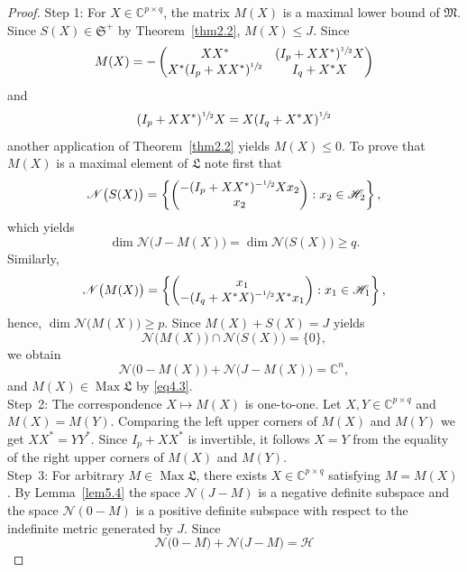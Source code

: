 \documentclass[12pt, a4paper, reqno, twoside]{amsart}
\numberwithin{equation}{section}
\DeclareMathOperator{\Max}{Max}
\newcommand{\frakS}{\mathfrak S}
\newcommand{\frakL}{\mathfrak L}
\newcommand{\frakM}{\mathfrak M}
\theoremstyle{definition}
\theoremstyle{remark}
\theoremstyle{mystyle}
\begin{document}
\begin{proof}
Step 1: For $X\in\mathbb C^{p\times q}$, the matrix $M(X)$ is a
maximal lower bound of $\frakM$. Since $S(X)\in\frakS^{+}$ by
Theorem~\ref{thm2.2}, $M(X)\leq J$. Since
\[
M(X)=
- \begin{pmatrix}
  XX^{\ast} & (I_{p}+XX^{\ast})^{\sfrac{1}{2}}X \\
  X^{\ast}(I_{p}+XX^{\ast})^{\sfrac{1}{2}} & I_{q}+X^{\ast}X
  \end{pmatrix}
\]
and
\[
(I_{p}+XX^{\ast})^{\sfrac{1}{2}}X = X(I_{q}+X^{\ast}X)^{\sfrac{1}{2}}
\]
another application of Theorem~\ref{thm2.2} yields $M(X)\leq0$. To
prove that $M(X)$ is a maximal element of $\frakL$ note first that
\[
  \mathscr N\bigl(S(X)\bigr)=\left\{
    \begin{pmatrix}
    -(I_{p}+XX^{\ast})^{-\sfrac{1}{2}} X x_{2} \\ x_{2}
    \end{pmatrix}
    : x_{2} \in\mathscr H_{2}\right\},
\]  
which yields
\[
\dim\mathscr N\bigl(J-M(X)\bigr) = \dim\mathscr N\bigl(S(X)\bigr)\geq q.
\]
Similarly,
\[
  \mathscr N\bigl(M(X)\bigr)=\left\{
    \begin{pmatrix}
    x_{1} \\
    -(I_{q}+X^{\ast}X)^{-\sfrac{1}{2}} X^{\ast}x_{1} 
    \end{pmatrix}
    : x_{1} \in\mathscr H_{1}\right\},
\]
hence, $\dim\mathscr N\bigl(M(X)\bigr)\geq p$.
Since $M(X)+S(X)=J$ yields
\[
\mathscr N\bigl(M(X)\bigr) \cap \mathscr N\bigl(S(X)\bigr) = \{0\},
\]
we obtain 
\[
\mathscr N\bigl(0-M(X)\bigr) + \mathscr N\bigl(J-M(X)\bigr) = \mathbb C^{n},
\]
and $M(X)\in\Max\frakL$ by \eqref{eq4.3}. \\
Step~2: The correspondence $X\mapsto M(X)$ is one-to-one. Let
$X,Y\in\mathbb C^{p\times q}$ and $M(X)=M(Y)$. Comparing the left
upper  corners of $M(X)$ and $M(Y)$ we get
$XX^{\ast}=YY^{\ast}$. Since $I_{p}+XX^{\ast}$ is invertible, it
follows $X=Y$ from the equality of the right upper corners of $M(X)$
and $M(Y)$. \\
Step~3: For arbitrary $M\in\Max\frakL$, there exists $X\in\mathbb
C^{p\times q}$ satisfying $M=M(X)$. By Lemma~\ref{lem5.4} the space
$\mathscr N(J-M)$ is a negative definite subspace and the space
$\mathscr N(0-M)$ is a positive definite subspace with respect to the
indefinite metric generated by $J$. Since 
\begin{equation}
\label{eq5.4}  
\mathscr N\bigl(0-M\bigr) + \mathscr N\bigl(J-M\bigr) = \mathscr H
\end{equation}

\end{proof}
\end{document}
